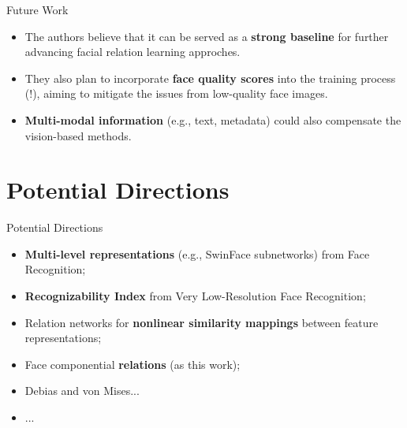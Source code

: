 \documentclass[aspectratio=169,xcolor=dvipsnames]{beamer}
\begin{document}
\begin{frame}{Future Work}
    \begin{itemize}
        \item The authors believe that it can be served as a \textbf{strong baseline} for further advancing facial relation learning approches.
        \item They also plan to incorporate \textbf{face quality scores} into the training process (!), aiming to mitigate the issues from low-quality face images.
        \item \textbf{Multi-modal information} (e.g., text, metadata) could also compensate the vision-based methods.
    \end{itemize}
    
\end{frame}


\section{Potential Directions}

\begin{frame}{Potential Directions}
    \begin{itemize}
        \item \textbf{Multi-level representations} (e.g., SwinFace subnetworks) from Face Recognition;
        \item \textbf{Recognizability Index} from Very Low-Resolution Face Recognition;
        \item Relation networks for \textbf{nonlinear similarity mappings} between feature representations;
        \item Face componential \textbf{relations} (as this work);
        \item Debias and von Mises...
        \item ...
    \end{itemize}
\end{frame}
\end{document}

